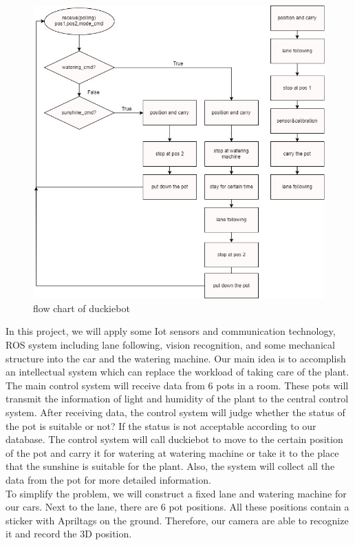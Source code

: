 \documentclass[a4paper, 10pt, conference]{ieeeconf}      %
\begin{document}
\begin{figure}[htbp] %
\includegraphics[width=0.8\columnwidth]{car_flowchart.jpg}
\centering
\caption{flow chart of duckiebot}
\end{figure}



\hspace*{4mm}In this project, we will apply some Iot sensors and communication technology, ROS system including lane following, vision recognition, and some mechanical structure into the car and the watering machine. Our main idea is to accomplish an intellectual system which can replace the workload of taking care of the plant. The main control system will receive data from 6 pots in a room. These pots will transmit the information of light and humidity of the plant to the central control system. After receiving data, the control system will judge whether the status of the pot is suitable or not? If the status is not acceptable according to our database. The control system will call duckiebot to move to the certain position of the pot and carry it for watering at watering machine or take it to the place that the sunshine is suitable for the plant. Also, the system will collect all the data from the pot for more detailed information. \\
\hspace*{4mm}To simplify the problem, we will construct a fixed lane and watering machine for our cars. Next to the lane, there are 6 pot positions. All these positions contain a sticker with Apriltags on the ground. Therefore, our camera are able to recognize it and record the 3D position. \\
\end{document}
